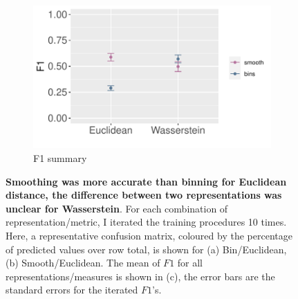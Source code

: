 \begin{figure}[htbp]
    \begin{subfigure}{\textwidth}
    \centering
    \includegraphics[scale=0.8]{graphics/f1_gle.pdf}
    \caption{F1 summary}
    \label{fig:f1_gle}
    \end{subfigure}
    
    
    \caption{\textbf{Smoothing was more accurate than binning for Euclidean distance, the difference between two representations was unclear for Wasserstein}. For each combination of representation/metric, I iterated the training procedures 10 times. Here, a representative confusion matrix, coloured by the percentage of predicted values over row total, is shown for (a) Bin/Euclidean, (b) Smooth/Euclidean. The mean of $F1$ for all representations/measures is shown in (c), the error bars are the standard errors for the iterated $F1$'s.}
    \label{fig:ml_gle}
\end{figure}
